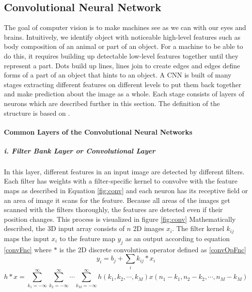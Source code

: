 \subsection{Convolutional Neural Network} \label{cnn}
The goal of computer vision is to make machines see as we can with our eyes and brains. Intuitively, we identify object with noticeable high-level features such as body composition of an animal or part of an object. For a machine to be able to do this, it requires building up detectable low-level features together until they represent a part. Dots build up lines, lines join to create edges and edges define forms of a part of an object that hints to an object. A CNN is built of many stages extracting different features on different levels to put them back together and make prediction about the image as a whole.  Each stage consists of layers of neurons which are described further in this section. The definition of the structure is based on \cite{convVision}.

\paragraph*{Common Layers of the Convolutional Neural Networks}
\subparagraph*{i. Filter Bank Layer or Convolutional Layer} In this layer, different features in an input image are detected by different filters. Each filter has weights with a filter-specific kernel to 
convolve with the feature maps as described in Equation \ref{fig:conv} and each neuron has its receptive field or an area of image it scans for the feature. Because all areas of the images get scanned with the filters thoroughly, the features are detected even if their position changes. This process is visualized in figure \ref{fig:conv} Mathematically described, the 3D input array consists of $n$ 2D images $x_i$. The filter kernel $k_{ij}$maps the input $x_i$ to the feature map $y_j$ as an output according to equation \eqref{convFnc} where $\ast$ is the 2D discrete convolution operator defined as \eqref{convOpFnc}
\begin{equation} \label{convFnc}
			y_i = b_j + {\sum_i}k_{ij} \ast x_i
\end{equation} 
\begin{equation} \label{convOpFnc}
			h \ast x = \overset{\infty}{\underset{k_1 = -\infty}{\sum}}\overset{\infty}{\underset{k_2 = -\infty}{\sum}} \cdots \overset{\infty}{\underset{k_M = -\infty}{\sum}} h(k_1, k_2, \cdots, k_M) x(n_1 - k_1, n_2 - k_2, \cdots, n_M - k_M)
\end{equation}

